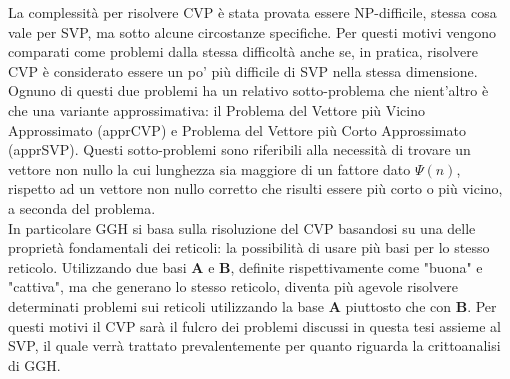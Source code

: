 La complessità per risolvere CVP è stata provata essere NP-difficile\cite{CVP-NP09}, stessa
cosa vale per SVP, ma sotto alcune circostanze specifiche\cite{SVP-NP02}. Per questi motivi vengono
comparati come problemi dalla stessa difficoltà anche se, in pratica, risolvere CVP è considerato 
essere un po' più difficile di SVP nella stessa dimensione.
Ognuno di questi due problemi ha un relativo sotto-problema che nient'altro è che una 
variante approssimativa: il Problema del Vettore più Vicino Approssimato (apprCVP) 
e Problema del Vettore più Corto Approssimato  (apprSVP). 
Questi sotto-problemi sono riferibili alla necessità di trovare un vettore non nullo la 
cui lunghezza sia maggiore di un fattore dato $\Psi(n)$, rispetto ad un vettore non nullo 
corretto che risulti essere più corto o più vicino, a seconda del problema.
\\
In particolare GGH si basa sulla risoluzione del CVP basandosi su una delle proprietà
fondamentali dei reticoli: la possibilità di usare più basi per lo stesso reticolo.
Utilizzando due basi $\mathbf{A}$ e $\mathbf{B}$, definite rispettivamente come 
"buona" e "cattiva", ma che generano lo stesso reticolo, diventa più agevole 
risolvere determinati problemi sui reticoli utilizzando la base $\mathbf{A}$ piuttosto 
che con $\mathbf{B}$. 
Per questi motivi il CVP sarà il fulcro dei problemi discussi in questa tesi assieme al SVP,
il quale verrà trattato prevalentemente per quanto riguarda la crittoanalisi di GGH. 